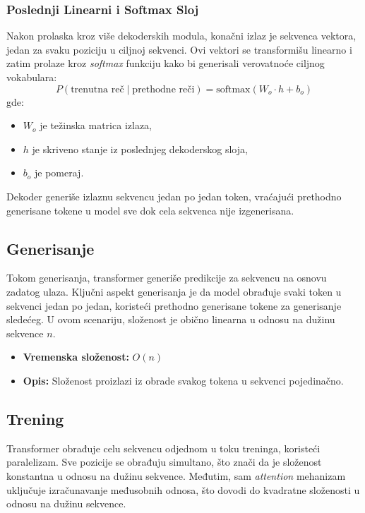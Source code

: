 \documentclass[12pt]{article}
\begin{document}
   \subsubsection*{Poslednji Linearni i Softmax Sloj}
   Nakon prolaska kroz više dekoderskih modula, konačni izlaz je sekvenca vektora, 
   jedan za svaku poziciju u ciljnoj sekvenci. Ovi vektori se transformišu 
   linearno i zatim prolaze kroz \textit{softmax} funkciju kako bi generisali verovatnoće 
   ciljnog vokabulara:
   \[
   P(\text{trenutna reč} \mid \text{prethodne reči}) = \text{softmax}(W_o \cdot h + b_o)
   \]
   \newpage
   gde:
   \begin{itemize}
      \vspace{-0.5cm}
      \setlength\itemsep{0.2em} %
      \item \( W_o \) je težinska matrica izlaza,
      \item \( h \) je skriveno stanje iz poslednjeg dekoderskog sloja,
      \item \( b_o \) je pomeraj.
   \end{itemize}
   Dekoder generiše izlaznu sekvencu jedan po jedan token, vraćajući prethodno 
   generisane tokene u model sve dok cela sekvenca nije izgenerisana.

   \subsection{Generisanje}
   Tokom generisanja, transformer generiše predikcije za sekvencu na osnovu zadatog ulaza. 
   Ključni aspekt generisanja je da model obrađuje svaki token u sekvenci jedan po jedan, 
   koristeći prethodno generisane tokene za generisanje sledećeg. U ovom scenariju, 
   složenost je obično linearna u odnosu na dužinu sekvence \(n\).

   \begin{itemize}
       \item \textbf{Vremenska složenost:} \(O(n)\)
       \item \textbf{Opis:} Složenost proizlazi iz obrade svakog tokena u sekvenci pojedinačno.
   \end{itemize}

   \subsection{Trening}
   Transformer obrađuje celu sekvencu odjednom u toku treninga, koristeći paralelizam. 
   Sve pozicije se obrađuju simultano, što znači da je složenost konstantna u odnosu 
   na dužinu sekvence. Međutim, sam \textit{attention} mehanizam uključuje 
   izračunavanje međusobnih odnosa, što dovodi do kvadratne složenosti u odnosu 
   na dužinu sekvence.
\end{document}
